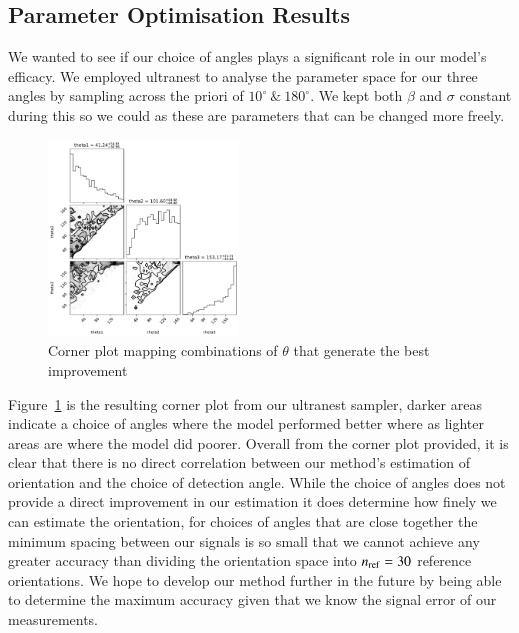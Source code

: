 \documentclass[final, 3p]{elsarticle}
\begin{document}
\subsection{Parameter Optimisation Results}
\label{sec:ultranest_res}

We wanted to see if our choice of angles plays a significant role in
our model's efficacy. We employed ultranest to analyse the parameter
space for our three angles by sampling across the priori of
$10^{\circ} \ \& \ 180^{\circ}$.   We kept both $\beta$ and $\sigma$
constant during this so we could as these are parameters that can be
changed more freely.

\begin{figure}[h]
	\centering
	\includegraphics[width=0.45\textwidth]{./Images/corneranglesfreed-1.png}
	\caption{Corner plot mapping combinations of $\theta$ that generate the best improvement}
	\label{fig:corner}
\end{figure}

Figure~\ref{fig:corner} is the resulting corner plot from our ultranest sampler, darker areas indicate a choice of angles where the model performed better where as lighter areas are where the model did poorer. Overall from the corner plot provided, it is clear that there is no direct correlation between our method's estimation of orientation and the
choice of detection angle. While the choice of angles does not provide a direct improvement in our estimation it does determine how finely we can estimate the orientation, for choices of angles that are close together the minimum spacing between our signals is so small that we cannot achieve any greater accuracy than dividing the orientation space into $n_{\rm ref}=30$ reference orientations.  We hope to develop our method further in the future by being able to determine the maximum accuracy given that we know the signal error of our measurements. 
\end{document}

